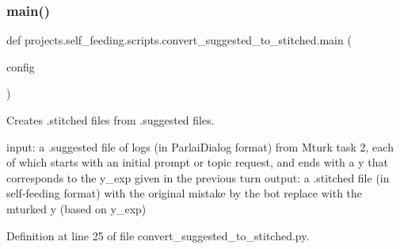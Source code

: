 \subsubsection{\texorpdfstring{main()}{main()}}
{\footnotesize\ttfamily def projects.\+self\+\_\+feeding.\+scripts.\+convert\+\_\+suggested\+\_\+to\+\_\+stitched.\+main (\begin{DoxyParamCaption}\item[{}]{config }\end{DoxyParamCaption})}

\begin{DoxyVerb}Creates .stitched files from .suggested files.

input: a .suggested file of logs (in ParlaiDialog format) from Mturk task 2, each of
    which starts with an initial prompt or topic request, and ends with a y
    that corresponds to the y_exp given in the previous turn
output: a .stitched file (in self-feeding format) with the original mistake by the
    bot replace with the mturked y (based on y_exp)
\end{DoxyVerb}
 

Definition at line 25 of file convert\+\_\+suggested\+\_\+to\+\_\+stitched.\+py.


